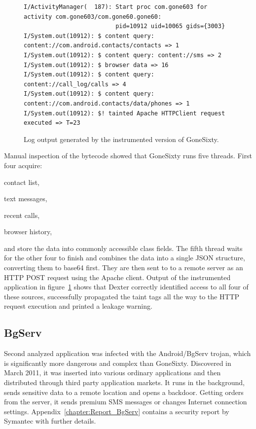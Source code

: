 \documentclass[12pt,twoside,notitlepage]{report}
\begin{document}
\begin{figure}[t]
	\scriptsize
	\begin{verbatim}
I/ActivityManager(  187): Start proc com.gone603 for activity com.gone603/com.gone60.gone60: 
                          pid=10912 uid=10065 gids={3003}
I/System.out(10912): $ content query: content://com.android.contacts/contacts => 1
I/System.out(10912): $ content query: content://sms => 2
I/System.out(10912): $ browser data => 16
I/System.out(10912): $ content query: content://call_log/calls => 4
I/System.out(10912): $ content query: content://com.android.contacts/data/phones => 1
I/System.out(10912): $! tainted Apache HTTPClient request executed => T=23
	\end{verbatim}
	\caption{Log output generated by the instrumented version of GoneSixty.}
	\label{figure:Evaluation_GoneSixty}
\end{figure}

Manual inspection of the bytecode showed that GoneSixty runs five threads. First four acquire:
\begin{inparaenum}[(i)]
\item contact list,
\item text messages,
\item recent calls,
\item browser history,
\end{inparaenum}
and store the data into commonly accessible class fields. The fifth thread waits for the other four to finish and combines the data into a single JSON structure, converting them to base64 first. They are then sent to to a remote server as an HTTP POST request using the Apache client. Output of the instrumented application in figure~\ref{figure:Evaluation_GoneSixty} shows that Dexter correctly identified access to all four of these sources, successfully propagated the taint tags all the way to the HTTP request execution and printed a leakage warning. 

\subsection{BgServ}

Second analyzed application was infected with the Android/BgServ trojan, which is significantly more dangerous and complex than GoneSixty. Discovered in March 2011, it was inserted into various ordinary applications and then distributed through third party application markets. It runs in the background, sends sensitive data to a remote location and opens a backdoor. Getting orders from the server, it sends premium SMS messages or changes Internet connection settings. Appendix~\ref{chapter:Report_BgServ} contains a security report by Symantec with further details. 
\end{document}
